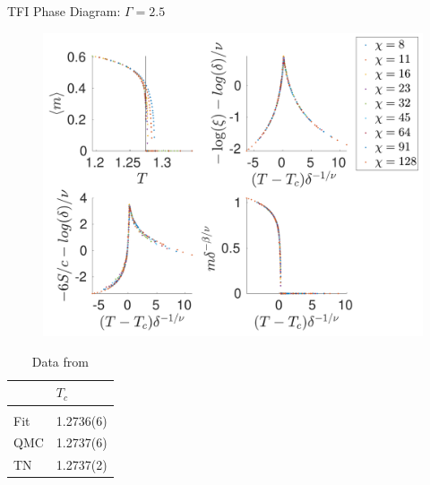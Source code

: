 \begin{frame}{TFI Phase Diagram: $\Gamma=2.5$}
    \begin{minipage}{.75\textwidth}
        \begin{figure}
            \center
            \includegraphics[height=\textheight]{../Figuren/phasediag/g25/zoomed_small.pdf}
        \end{figure}
    \end{minipage}
    \begin{minipage}{.24\textwidth}
        \begin{table}[]

            \begin{tabular}{l|l }
                    & $T_c$     \\
                \hline          \\
                Fit & 1.2736(6) \\
                QMC & 1.2737(6) \\
                TN  & 1.2737(2) \\
            \end{tabular}
            \caption*{Data from  \cite{Czarnik2019} }
        \end{table}
    \end{minipage}
\end{frame}

